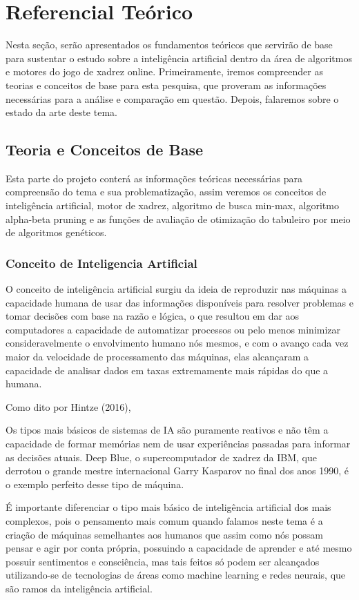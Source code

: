 \chapter{Referencial Teórico}
Nesta seção, serão apresentados os fundamentos teóricos que servirão de base para sustentar o estudo sobre a inteligência
artificial dentro da área de algoritmos e motores do jogo de xadrez online. Primeiramente, iremos compreender as teorias e
conceitos de base para esta pesquisa, que proveram as informações necessárias para a análise e comparação em questão.
Depois, falaremos sobre o estado da arte deste tema.

\section{Teoria e Conceitos de Base}
Esta parte do projeto conterá as informações teóricas necessárias para compreensão do tema e sua problematização,
assim veremos os conceitos de inteligência artificial, motor de xadrez, algoritmo de busca min-max,
algoritmo alpha-beta pruning e as funções de avaliação de otimização do tabuleiro por meio de algoritmos genéticos.

\subsection{Conceito de Inteligencia Artificial}
O conceito de inteligência artificial surgiu da ideia de reproduzir nas máquinas a capacidade humana de usar das informações
disponíveis para resolver problemas e tomar decisões com base na razão e lógica, o que resultou em dar aos computadores a
capacidade de automatizar processos ou pelo menos minimizar consideravelmente o envolvimento humano nós mesmos,
e com o avanço cada vez maior da velocidade de processamento das máquinas, elas alcançaram a capacidade de analisar dados
em taxas extremamente mais rápidas do que a humana.

Como dito por Hintze (2016),
\begin{citacao}
    Os tipos mais básicos de sistemas de IA são puramente reativos e não têm a capacidade de formar memórias nem de usar
    experiências passadas para informar as decisões atuais. Deep Blue, o supercomputador de xadrez da IBM, que derrotou o
    grande mestre internacional Garry Kasparov no final dos anos 1990, é o exemplo perfeito desse tipo de máquina.
    \cite[tradução nossa.]{HINTZE}
\end{citacao}

É importante diferenciar o tipo mais básico de inteligência artificial dos mais complexos, pois o pensamento mais comum
quando falamos neste tema é a criação de máquinas semelhantes aos humanos que assim como nós possam pensar e agir por conta
própria, possuindo a capacidade de aprender e até mesmo possuir sentimentos e consciência, mas tais feitos só podem ser
alcançados utilizando-se de tecnologias de áreas como machine learning e redes neurais, que são ramos da inteligência
artificial.


